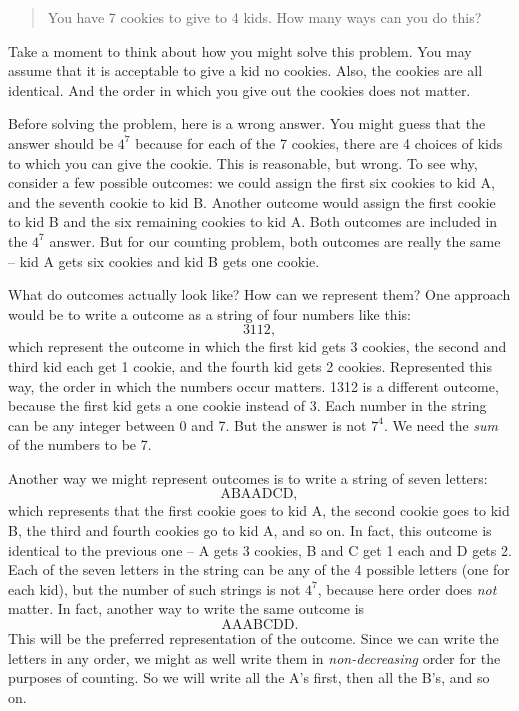 \documentclass[12pt]{article}
\begin{document}
\begin{quote}
  You have 7 cookies to give to 4 kids.  How many ways can you do this?
\end{quote}

Take a moment to think about how you might solve this problem.  You may assume that it is acceptable to give a kid no cookies.  Also, the cookies are all identical.  And the order in which you give out the cookies does not matter.

Before solving the problem, here is a wrong answer.  You might guess that the answer should be $4^7$ because for each of the 7 cookies, there are 4 choices of kids to which you can give the cookie. This is reasonable, but wrong.  To see why, consider a few possible outcomes:  we could assign the first six cookies to kid A, and the seventh cookie to kid B.  Another outcome would assign the first cookie to kid B and the six remaining cookies to kid A.  Both outcomes are included in the $4^7$ answer.  But for our counting problem, both outcomes are really the same -- kid A gets six cookies and kid B gets one cookie.

What do outcomes actually look like?  How can we represent them? One approach would be to write a outcome as a string of four numbers like this:
\[3112,\]
which represent the outcome in which the first kid gets 3 cookies, the second and third kid each get 1 cookie, and the fourth kid gets 2 cookies.  Represented this way, the order in which the numbers occur matters.  1312 is a different outcome, because the first kid gets a one cookie instead of 3.  Each number in the string can be any integer between 0 and 7.  But the answer is not $7^4$.  We need the {\em sum} of the numbers to be 7.  

Another way we might represent outcomes is to write a string of seven letters:
\[\mbox{ABAADCD},\]
which represents that the first cookie goes to kid A, the second cookie goes to kid B, the third and fourth cookies go to kid A, and so on.  In fact, this outcome is identical to the previous one -- A gets 3 cookies, B and C get 1 each and D gets 2.  Each of the seven letters in the string can be any of the 4 possible letters (one for each kid), but the number of such strings is not $4^7$, because here order does {\em not} matter.  In fact, another way to write the same outcome is
\[\mbox{AAABCDD}.\]
This will be the preferred representation of the outcome.  Since we can write the letters in any order, we might as well write them in {\em non-decreasing} order for the purposes of counting.  So we will write all the A's first, then all the B's, and so on.  
\end{document}
